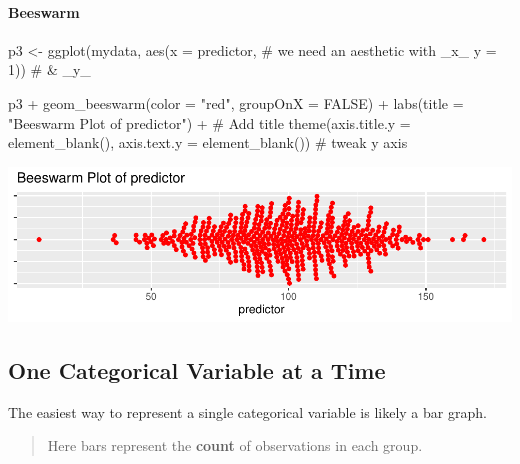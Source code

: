 \documentclass[12pt,]{article}
\newenvironment{Shaded}{}{}
\newcommand{\CommentTok}[1]{\textcolor[rgb]{0.00,0.50,0.00}{#1}}
\newcommand{\DataTypeTok}[1]{#1}
\newcommand{\DecValTok}[1]{#1}
\newcommand{\KeywordTok}[1]{\textcolor[rgb]{0.00,0.00,1.00}{#1}}
\newcommand{\NormalTok}[1]{#1}
\newcommand{\OperatorTok}[1]{#1}
\newcommand{\OtherTok}[1]{\textcolor[rgb]{1.00,0.25,0.00}{#1}}
\newcommand{\StringTok}[1]{\textcolor[rgb]{0.00,0.50,0.50}{#1}}
\let\oldparagraph\paragraph
\renewcommand{\paragraph}[1]{\oldparagraph{#1}\mbox{}}
\begin{document}
\hypertarget{beeswarm}{%
\paragraph{Beeswarm}\label{beeswarm}}

\begin{Shaded}
\begin{Highlighting}[]
\NormalTok{p3 <-}\StringTok{ }\KeywordTok{ggplot}\NormalTok{(mydata, }
             \KeywordTok{aes}\NormalTok{(}\DataTypeTok{x =}\NormalTok{ predictor, }\CommentTok{# we need an aesthetic with _x_}
                 \DataTypeTok{y =} \DecValTok{1}\NormalTok{)) }\CommentTok{# & _y_}

\NormalTok{p3 }\OperatorTok{+}\StringTok{ }\KeywordTok{geom_beeswarm}\NormalTok{(}\DataTypeTok{color =} \StringTok{"red"}\NormalTok{, }
                   \DataTypeTok{groupOnX =} \OtherTok{FALSE}\NormalTok{) }\OperatorTok{+}
\StringTok{  }\KeywordTok{labs}\NormalTok{(}\DataTypeTok{title =} \StringTok{"Beeswarm Plot of predictor"}\NormalTok{) }\OperatorTok{+}\StringTok{ }\CommentTok{# Add title}
\StringTok{  }\KeywordTok{theme}\NormalTok{(}\DataTypeTok{axis.title.y =} \KeywordTok{element_blank}\NormalTok{(), }
        \DataTypeTok{axis.text.y =} \KeywordTok{element_blank}\NormalTok{()) }\CommentTok{# tweak y axis}
\end{Highlighting}
\end{Shaded}

\includegraphics{introduction-to-ggplot2_files/figure-latex/unnamed-chunk-12-1.pdf}

\hypertarget{one-categorical-variable-at-a-time}{%
\subsection{One Categorical Variable at a
Time}\label{one-categorical-variable-at-a-time}}

The easiest way to represent a single categorical variable is likely a
bar graph.

\begin{quote}
Here bars represent the \textbf{count} of observations in each group.
\end{quote}
\end{document}
